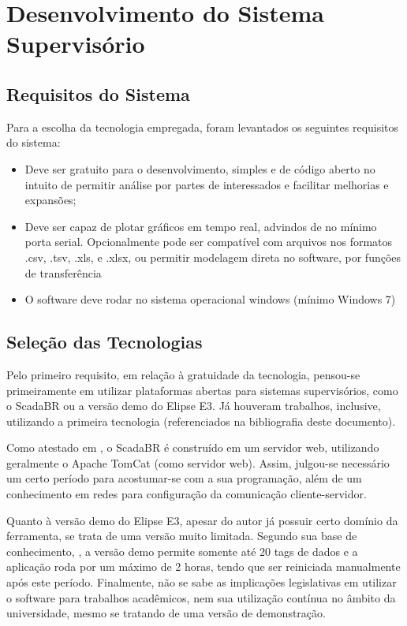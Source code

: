 \chapter{Desenvolvimento do Sistema Supervisório}

\section{Requisitos do Sistema}

Para a escolha da tecnologia empregada, foram levantados os seguintes requisitos do sistema:
\begin{itemize}
	\item Deve ser gratuito para o desenvolvimento, simples e de código aberto no intuito de permitir análise por partes de interessados e facilitar melhorias e expansões;
	\item Deve ser capaz de plotar gráficos em tempo real, advindos de no mínimo porta serial. Opcionalmente pode ser compatível com arquivos nos formatos .csv, .tsv, .xls, e .xlsx, ou permitir modelagem direta no software, por funções de transferência
	\item O software deve rodar no sistema operacional windows (mínimo Windows 7)
\end{itemize}

\section{Seleção das Tecnologias}

Pelo primeiro requisito, em relação à gratuidade da tecnologia, pensou-se primeiramente em utilizar plataformas abertas para sistemas supervisórios, como o ScadaBR ou a versão demo do Elipse E3. Já houveram trabalhos, inclusive, utilizando a primeira tecnologia (referenciados na bibliografia deste documento).

Como atestado em \cite{Moraes2016}, o ScadaBR é construído em um servidor web, utilizando geralmente o Apache TomCat (como servidor web). Assim, julgou-se necessário um certo período para acostumar-se com a sua programação, além de um conhecimento em redes para configuração da comunicação cliente-servidor.

Quanto à versão demo do Elipse E3, apesar do autor já possuir certo domínio da ferramenta, se trata de uma versão muito limitada. Segundo sua base de conhecimento, \cite{Elipse2019}, a versão demo permite somente até 20 tags de dados e a aplicação roda por um máximo de 2 horas, tendo que ser reiniciada manualmente após este período. Finalmente, não se sabe as implicações legislativas em utilizar o software para trabalhos acadêmicos, nem sua utilização contínua no âmbito da universidade, mesmo se tratando de uma versão de demonstração.

